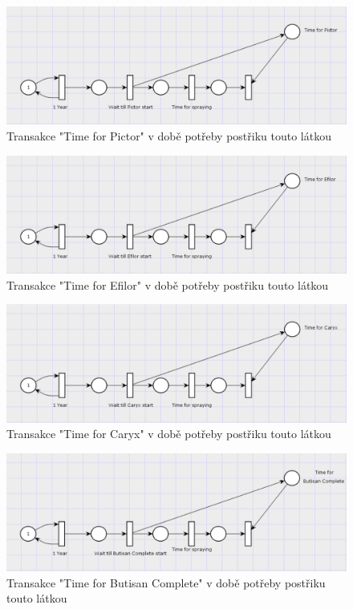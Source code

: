\documentclass[11pt,a4paper,titlepage]{article}
\begin{document}
\begin{figure}[ht!]
\centering
\includegraphics[scale=0.3]{img/GenPictorTime.png}
\caption{Transakce "Time for Pictor" v době potřeby postřiku touto látkou}
\end{figure}

\begin{figure}[ht!]
\centering
\includegraphics[scale=0.3]{img/GenEfilorTime.png}
\caption{Transakce "Time for Efilor" v době potřeby postřiku touto látkou}
\end{figure}

\begin{figure}[ht!]
\centering
\includegraphics[scale=0.3]{img/GenCaryxTime.png}
\caption{Transakce "Time for Caryx" v době potřeby postřiku touto látkou}
\end{figure}

\begin{figure}[ht!]
\centering
\includegraphics[scale=0.3]{img/GenButisanCompleteTime.png}
\caption{Transakce "Time for Butisan Complete" v době potřeby postřiku touto látkou}
\end{figure}
\end{document}

